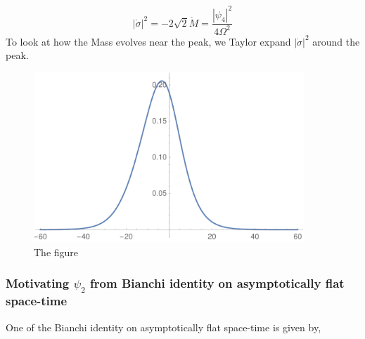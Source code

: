 \documentclass[prd,preprintnumbers,onecolumn,eqsecnum,floatfix,letter]{revtex4}
\begin{document}
\begin{equation}
	|\dot{\sigma}|^2 = -2\sqrt{2}\dot{M} = \frac{|\psi_4|^2}{4\Omega^2}
\end{equation}
To look at how the Mass evolves near the peak, we Taylor expand $|\dot{\sigma}|^2$ around the peak.
\begin{figure}
	\includegraphics[width=4.0in]{../plots/SigmaSqr.pdf}
	\caption{The figure}
	\label{fig:SigmaSqr}
\end{figure} 
\subsubsection{Motivating $\psi_2$ from Bianchi identity on asymptotically flat space-time}
One of the Bianchi identity on asymptotically flat space-time is given by,
\end{document}

